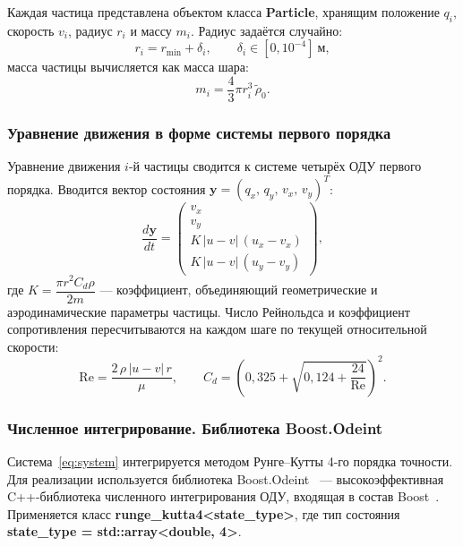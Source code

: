 \documentclass[14pt,a4paper]{extarticle}
\numberwithin{figure}{section}
\numberwithin{table}{section}
\begin{document}
Каждая частица представлена объектом класса \textbf{Particle}, хранящим
положение $q_i$, скорость $v_i$, радиус $r_i$ и массу $m_i$.
Радиус задаётся случайно:
\begin{equation}
    r_i = r_{\min} + \delta_i, \qquad \delta_i \in \left[0, 10^{-4}\right]\ \text{м},
\end{equation}
масса частицы вычисляется как масса шара:
\begin{equation}
    m_i = \frac{4}{3}\pi r_i^3\,\tilde{\rho}_0.
\end{equation}

\subsubsection{Уравнение движения в форме системы первого порядка}

Уравнение движения $i$-й частицы сводится к системе четырёх ОДУ первого порядка.
Вводится вектор состояния $\mathbf{y} = (q_x,\, q_y,\, v_x,\, v_y)^T$:
\begin{equation}
    \frac{d\mathbf{y}}{dt} =
    \begin{pmatrix}
        v_x \\[4pt] v_y \\[4pt]
        K\,|u - v|\,(u_x - v_x) \\[4pt]
        K\,|u - v|\,(u_y - v_y)
    \end{pmatrix},
    \label{eq:system}
\end{equation}
где $K = \dfrac{\pi r^2 C_d \rho}{2m}$ --- коэффициент, объединяющий геометрические
и аэродинамические параметры частицы. Число Рейнольдса и коэффициент сопротивления
пересчитываются на каждом шаге по текущей относительной скорости:
\begin{equation}
    \mathrm{Re} = \frac{2\,\rho\,|u - v|\,r}{\mu}, \qquad
    C_d = \left(0{,}325 + \sqrt{0{,}124 + \frac{24}{\mathrm{Re}}}\right)^2.
\end{equation}

\subsubsection{Численное интегрирование. Библиотека Boost.Odeint}

Система~\eqref{eq:system} интегрируется методом Рунге--Кутты 4-го порядка точности.
Для реализации используется библиотека Boost.Odeint~\cite{BoostOdeint} ---
высокоэффективная C++-библиотека численного интегрирования ОДУ, входящая
в состав Boost~\cite{BoostLibrary}. Применяется класс \textbf{runge\_kutta4<state\_type>},
где тип состояния \textbf{state\_type = std::array<double, 4>}.
\end{document}
